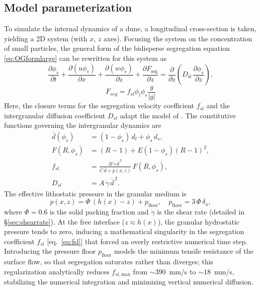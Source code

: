 \documentclass[lineno]{JFM-FLM_Au}
\begin{document}
\subsection{Model parameterization}
\label{sec:parameterization}
To simulate the internal dynamics of a dune, a longitudinal cross-section is taken, yielding a 2D system (with $x$, $z$ axes). Focusing the system on the concentration of small particles, the general form of the bidisperse segregation equation \eqref{eq:OGformlarge} can be rewritten for this system as
\begin{equation}
    \frac{\partial \phi_s}{\partial t} + \frac{\partial (u\phi_s)}{\partial x} + \frac{\partial (w\phi_s)}{\partial z} + \frac{\partial F_{\mathrm{seg}}}{\partial z} = \frac{\partial}{\partial z}\!\left(D_{\mathrm{sl}}\,\frac{\partial \phi_s}{\partial z}\right),
    \label{eq:systemform}
\end{equation}
\begin{equation}
    F_{seg} = f_{sl} \phi_l \phi_s \frac{g}{|g|}
\end{equation}
Here, the closure terms for the segregation velocity coefficient $f_{sl}$ and the intergranular diffusion coefficient $D_{sl}$ adapt the model of \citet{trewhela2021}. The constitutive functions governing the intergranular dynamics are
\begin{align}
    \bar d(\phi_s) &= (1-\phi_s)\,d_l + \phi_s\,d_s, \label{eq:dbar}\\
    F(R,\phi_s) &= (R-1) + E(1-\phi_s)(R-1)^2, \label{eq:FRphi}\\
    f_{sl} &= \frac{B\,\dot\gamma\,\bar d^{\,2}}{C\,\bar d + p(x,z)}\,F(R,\phi_s), \label{eq:fsl}\\
    D_{sl} &= A\,\dot\gamma\,\bar d^{\,2}. \label{eq:Dsl}
\end{align}
The effective lithostatic pressure in the granular medium is
\begin{equation}
    p(x,z) = \Phi\,(h(x)-z) + p_{\mathrm{floor}}, \quad p_{\mathrm{floor}} = 3\,\Phi\,\delta_a,
    \label{eq:pressure}
\end{equation}
where $\Phi = 0.6$ is the solid packing fraction and $\dot\gamma$ is the shear rate (detailed in \S\ref{sec:shearrate}). At the free interface ($z \approx h(x)$), the granular hydrostatic pressure tends to zero, inducing a mathematical singularity in the segregation coefficient $f_{sl}$ [eq.~\eqref{eq:fsl}] that forced an overly restrictive numerical time step. Introducing the pressure floor $p_{\mathrm{floor}}$ models the minimum tensile resistance of the surface flow, so that segregation saturates rather than diverges; this regularization analytically reduces $f_{sl,\mathrm{max}}$ from $\sim 390$~mm/s to $\sim 18$~mm/s, stabilizing the numerical integration and minimizing vertical numerical diffusion.
\end{document}
